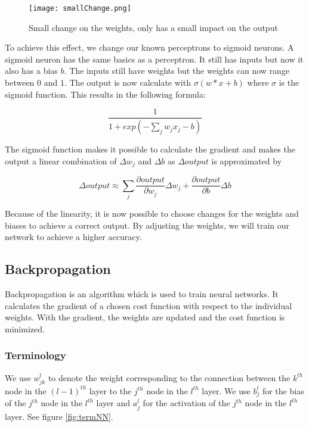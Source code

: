 \begin{figure}[H]
	\centering
	\texttt{[image: smallChange.png]}
	\caption{Small change on the weights, only has a small impact on the output \cite{NNintro:online}}
	\label{fig:smallChange}
\end{figure} 

To achieve this effect, we change our known perceptrons to sigmoid neurons. A sigmoid neuron has the same basics as a perceptron. It still has inputs but now it also has a bias $b$. The inputs still have weights but the weights can now range between $0$ and $1$. The output is now calculate with $\sigma(w*x+b)$ where $\sigma$ is the sigmoid function. This results in the following formula: 

\begin{equation} 
\frac{1}{1+exp(-\sum_j w_jx_j-b)}
\end{equation}

The sigmoid function makes it possible to calculate the gradient and makes the output a linear combination of $\Delta w_j$ and $\Delta b$ as $\Delta output$ is approximated by 

\begin{equation} 
\Delta output \approx \sum_j \frac{\partial output}{\partial w_j}\Delta w_j + \frac{\partial output}{\partial b}\Delta b
\end{equation}

Because of the linearity, it is now possible to choose changes for the weights and biases to achieve a correct output. By adjusting the weights, we will train our network to achieve a higher accuracy.
		
	\subsection{Backpropagation}
	
Backpropagation is an algorithm which is used to train neural networks. It calculates the gradient of a chosen cost function with respect to the individual weights. With the gradient, the weights are updated and the cost function is minimized.

		\subsubsection{Terminology}
		
We use $w^l_{jk}$ to denote the weight corresponding to the connection between the $k^{th}$ node in the $(l-1)^{th}$ layer to the $j^{th}$ node in the $l^{th}$ layer. We use $b^l_j$ for the bias of the $j^{th}$ node in the $l^{th}$ layer and $a^l_j$ for the activation of the $j^{th}$ node in the $l^{th}$ layer. See figure \ref{fig:termNN}.

